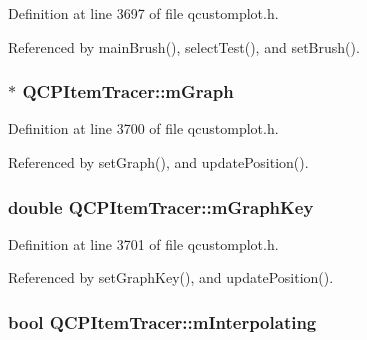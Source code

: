 Definition at line 3697 of file qcustomplot.\+h.



Referenced by main\+Brush(), select\+Test(), and set\+Brush().

\hypertarget{class_q_c_p_item_tracer_a2d70cf616b579563aa15f796dfc143ac}{}
\subsubsection[{m\+Graph}]{$\ast$ Q\+C\+P\+Item\+Tracer\+::m\+Graph\hspace{0.3cm}{\ttfamily [protected]}}\label{class_q_c_p_item_tracer_a2d70cf616b579563aa15f796dfc143ac}


Definition at line 3700 of file qcustomplot.\+h.



Referenced by set\+Graph(), and update\+Position().

\hypertarget{class_q_c_p_item_tracer_a8fa20f2e9ee07d21fd7c8d30ba4702ca}{}
\subsubsection[{m\+Graph\+Key}]{\setlength{\rightskip}{0pt plus 5cm}double Q\+C\+P\+Item\+Tracer\+::m\+Graph\+Key\hspace{0.3cm}{\ttfamily [protected]}}\label{class_q_c_p_item_tracer_a8fa20f2e9ee07d21fd7c8d30ba4702ca}


Definition at line 3701 of file qcustomplot.\+h.



Referenced by set\+Graph\+Key(), and update\+Position().

\hypertarget{class_q_c_p_item_tracer_afab37c22ad39f235921e86f93cd84595}{}
\subsubsection[{m\+Interpolating}]{\setlength{\rightskip}{0pt plus 5cm}bool Q\+C\+P\+Item\+Tracer\+::m\+Interpolating\hspace{0.3cm}{\ttfamily [protected]}}\label{class_q_c_p_item_tracer_afab37c22ad39f235921e86f93cd84595}


